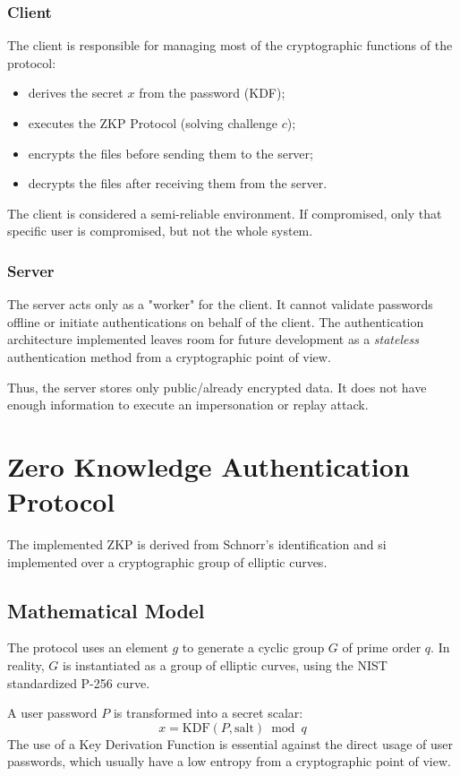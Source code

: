 \documentclass[conference]{IEEEtran}
\begin{document}
\subsubsection{Client}
The client is responsible for managing most of the cryptographic functions of the protocol:
\begin{itemize}
    \item derives the secret $x$ from the password (KDF);
    \item executes the ZKP Protocol (solving challenge $c$);
    \item encrypts the files before sending them to the server;
    \item decrypts the files after receiving them from the server.
\end{itemize}
The client is considered a semi-reliable environment. If compromised, only that specific user is compromised, but not the whole system.
\subsubsection{Server}
The server acts only as a "worker" for the client. It cannot validate passwords offline or initiate authentications on behalf of the client. The authentication architecture implemented leaves room for future development as a \textit{stateless} authentication method from a cryptographic point of view.

Thus, the server stores only public/already encrypted data. It does not have enough information to execute an impersonation or replay attack.
\newpage
\section{Zero Knowledge Authentication Protocol}
The implemented ZKP is derived from Schnorr's identification and si implemented over a cryptographic group of elliptic curves.
\subsection{Mathematical Model}

The protocol uses an element $g$ to generate a cyclic group $G$ of prime order $q$. In reality, $G$ is instantiated as a group of elliptic curves, using the NIST standardized P-256 curve.

A user password $P$ is transformed into a secret scalar:
\begin{equation}
x = \mathrm{KDF}(P, \text{salt}) \bmod q
\end{equation}
The use of a Key Derivation Function is essential against the direct usage of user passwords, which usually have a low entropy from a cryptographic point of view.
\end{document}
